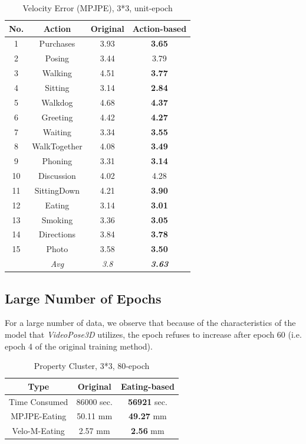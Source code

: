 \documentclass[10pt,twocolumn,letterpaper]{article}
\begin{document}
\begin{table}[H]
\caption{Velocity Error (MPJPE), 3*3, unit-epoch}

\begin{center}

\begin{tabular}{cccc}
\hline
No. & Action & Original & Action-based \\
\hline

1&Purchases& 3.93 & \textbf{3.65} \\
2&Posing& 3.44 & 3.79 \\
3&Walking& 4.51 & \textbf{3.77}\\
4&Sitting& 3.14 & \textbf{2.84} \\
5&Walkdog& 4.68 & \textbf{4.37} \\
6&Greeting& 4.42 & \textbf{4.27}\\
7&Waiting& 3.34 & \textbf{3.55} \\
8&WalkTogether& 4.08 & \textbf{3.49}\\
9&Phoning& 3.31 & \textbf{3.14} \\
10&Discussion& 4.02 & 4.28 \\
11&SittingDown& 4.21 & \textbf{3.90}\\
12&Eating& 3.14 & \textbf{3.01} \\
13&Smoking& 3.36 & \textbf{3.05}\\
14&Directions& 3.84 & \textbf{3.78}\\
15&Photo& 3.58 & \textbf{3.50}\\
&\textit{Avg}& \textit{3.8} & \textit{\textbf{3.63}}\\

\hline
\end{tabular}

\end{center}

\end{table}


\subsection{Large Number of Epochs}

For a large number of data, we observe that because of the characteristics of the model that \textit{VideoPose3D}
utilizes, the epoch refuses to increase after epoch 60 (i.e. epoch 4 of the original training method).


\begin{table}[H]
\caption{Property Cluster, 3*3, 80-epoch}
\centering
\begin{tabular}{ccc}
\hline
Type & Original  & Eating-based\\
\hline

Time Consumed&  86000 sec. & \textbf{56921} sec.\\
MPJPE-Eating&  50.11 mm & \textbf{49.27} mm\\
Velo-M-Eating&  2.57 mm & \textbf{2.56} mm  \\

\hline
\end{tabular}
\end{table}
\end{document}
